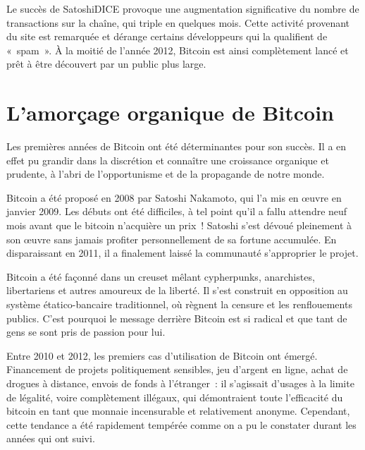 Le succès de SatoshiDICE provoque une augmentation significative du nombre de transactions sur la chaîne, qui triple en quelques mois. Cette activité provenant du site est remarquée et dérange certains développeurs qui la qualifient de «~spam~». À la moitié de l'année 2012, Bitcoin est ainsi complètement lancé et prêt à être découvert par un public plus large.

\section*{L'amorçage organique de Bitcoin}

Les premières années de Bitcoin ont été déterminantes pour son succès. Il a en effet pu grandir dans la discrétion et connaître une croissance organique et prudente, à l'abri de l'opportunisme et de la propagande de notre monde.

Bitcoin a été proposé en 2008 par Satoshi Nakamoto, qui l'a mis en œuvre en janvier 2009. Les débuts ont été difficiles, à tel point qu'il a fallu attendre neuf mois avant que le bitcoin n'acquière un prix~! Satoshi s'est dévoué pleinement à son œuvre sans jamais profiter personnellement de sa fortune accumulée. En disparaissant en 2011, il a finalement laissé la communauté s'approprier le projet.

Bitcoin a été façonné dans un creuset mêlant cypherpunks, anarchistes, libertariens et autres amoureux de la liberté. Il s'est construit en opposition au système étatico-bancaire traditionnel, où règnent la censure et les renflouements publics. C'est pourquoi le message derrière Bitcoin est si radical et que tant de gens se sont pris de passion pour lui.

Entre 2010 et 2012, les premiers cas d'utilisation de Bitcoin ont émergé. Financement de projets politiquement sensibles, jeu d'argent en ligne, achat de drogues à distance, envois de fonds à l'étranger~: il s'agissait d'usages à la limite de légalité, voire complètement illégaux, qui démontraient toute l'efficacité du bitcoin en tant que monnaie incensurable et relativement anonyme. Cependant, cette tendance a été rapidement tempérée comme on a pu le constater durant les années qui ont suivi.